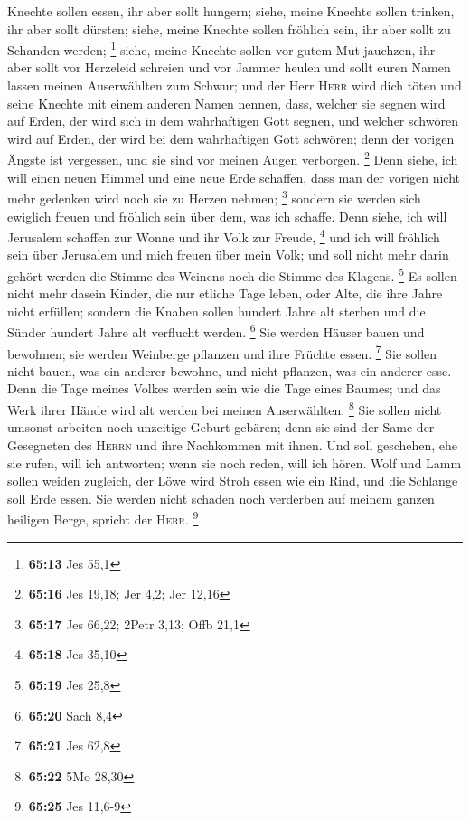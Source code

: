 Knechte sollen essen, ihr aber sollt hungern; siehe, meine Knechte
sollen trinken, ihr aber sollt dürsten; siehe, meine Knechte sollen
fröhlich sein, ihr aber sollt zu Schanden werden; \footnote{\textbf{65:13}
  Jes 55,1}  siehe, meine Knechte sollen vor gutem Mut
jauchzen, ihr aber sollt vor Herzeleid schreien und vor Jammer heulen
 und sollt euren Namen lassen meinen Auserwählten zum
Schwur; und der Herr \textsc{Herr} wird dich töten und seine Knechte mit
einem anderen Namen nennen,  dass, welcher sie segnen
wird auf Erden, der wird sich in dem wahrhaftigen Gott segnen, und
welcher schwören wird auf Erden, der wird bei dem wahrhaftigen Gott
schwören; denn der vorigen Ängste ist vergessen, und sie sind vor meinen
Augen verborgen. \footnote{\textbf{65:16} Jes 19,18; Jer 4,2; Jer 12,16}
 Denn siehe, ich will einen neuen Himmel und eine neue
Erde schaffen, dass man der vorigen nicht mehr gedenken wird noch sie zu
Herzen nehmen; \footnote{\textbf{65:17} Jes 66,22; 2Petr 3,13; Offb 21,1}
 sondern sie werden sich ewiglich freuen und fröhlich
sein über dem, was ich schaffe. Denn siehe, ich will Jerusalem schaffen
zur Wonne und ihr Volk zur Freude, \footnote{\textbf{65:18} Jes 35,10}
 und ich will fröhlich sein über Jerusalem und mich
freuen über mein Volk; und soll nicht mehr darin gehört werden die
Stimme des Weinens noch die Stimme des Klagens. \footnote{\textbf{65:19}
  Jes 25,8}  Es sollen nicht mehr dasein Kinder, die nur
etliche Tage leben, oder Alte, die ihre Jahre nicht erfüllen; sondern
die Knaben sollen hundert Jahre alt sterben und die Sünder hundert Jahre
alt verflucht werden. \footnote{\textbf{65:20} Sach 8,4} 
Sie werden Häuser bauen und bewohnen; sie werden Weinberge pflanzen und
ihre Früchte essen. \footnote{\textbf{65:21} Jes 62,8} 
Sie sollen nicht bauen, was ein anderer bewohne, und nicht pflanzen, was
ein anderer esse. Denn die Tage meines Volkes werden sein wie die Tage
eines Baumes; und das Werk ihrer Hände wird alt werden bei meinen
Auserwählten. \footnote{\textbf{65:22} 5Mo 28,30}  Sie
sollen nicht umsonst arbeiten noch unzeitige Geburt gebären; denn sie
sind der Same der Gesegneten des \textsc{Herrn} und ihre Nachkommen mit
ihnen.  Und soll geschehen, ehe sie rufen, will ich
antworten; wenn sie noch reden, will ich hören.  Wolf und
Lamm sollen weiden zugleich, der Löwe wird Stroh essen wie ein Rind, und
die Schlange soll Erde essen. Sie werden nicht schaden noch verderben
auf meinem ganzen heiligen Berge, spricht der \textsc{Herr}. \footnote{\textbf{65:25}
  Jes 11,6-9}

